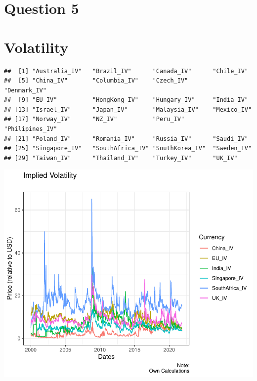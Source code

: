 \documentclass[11pt,preprint, authoryear]{elsarticle}
\numberwithin{equation}{section}
\numberwithin{figure}{section}
\numberwithin{table}{section}
\begin{document}
\pagestyle{fancy}
\chead{}
\rhead{}
\lfoot{}
\lhead{}
\cfoot{}


\headsep 35pt %




\hypertarget{question-5}{%
\section{Question 5}\label{question-5}}

\hypertarget{volatility}{%
\section{Volatility}\label{volatility}}

\begin{verbatim}
##  [1] "Australia_IV"   "Brazil_IV"      "Canada_IV"      "Chile_IV"      
##  [5] "China_IV"       "Columbia_IV"    "Czech_IV"       "Denmark_IV"    
##  [9] "EU_IV"          "HongKong_IV"    "Hungary_IV"     "India_IV"      
## [13] "Israel_IV"      "Japan_IV"       "Malaysia_IV"    "Mexico_IV"     
## [17] "Norway_IV"      "NZ_IV"          "Peru_IV"        "Philipines_IV" 
## [21] "Poland_IV"      "Romania_IV"     "Russia_IV"      "Saudi_IV"      
## [25] "Singapore_IV"   "SouthAfrica_IV" "SouthKorea_IV"  "Sweden_IV"     
## [29] "Taiwan_IV"      "Thailand_IV"    "Turkey_IV"      "UK_IV"
\end{verbatim}

\includegraphics{Question5_files/figure-latex/unnamed-chunk-3-1.pdf}
\end{document}
